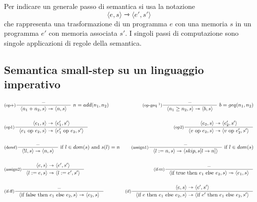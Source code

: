 \documentclass[a4paper, 11pt]{article}
\begin{document}
Per indicare un generale passo di semantica si usa la notazione \[ \langle e, s \rangle \rightarrowtriangle \langle e', s' \rangle \]
che rappresenta una trasformazione di un programma $e$ con una memoria $s$ in un programma $e'$ con memoria associata $s'$.
I singoli passi di computazione sono singole applicazioni di regole della semantica.

\subsection{Semantica small-step su un linguaggio imperativo} \label{rules}
\begin{adjustwidth}{-1.3cm}{}
\begin{align*}
	&\inference[(op+)]{-}{\langle n_1 + n_2, s \rangle \rightarrowtriangle \langle n, s \rangle}\ n = add(n_1, n_2)
	&\inference[(op-geq \footnotemark)]{-}{\langle n_1 \geq n_2, s \rangle \rightarrowtriangle \langle b, s \rangle}\ b = geq(n_1, n_2) \\
		& &\\
	&\inference[(op1)]{\langle e_1, s \rangle \rightarrowtriangle \langle e_1', s' \rangle}{\langle e_1 \text{ op } e_2, s \rangle \rightarrowtriangle \langle e_1' \text{ op } e_2, s' \rangle}  &\inference[(op2)]{\langle e_2, s \rangle \rightarrowtriangle \langle e_2', s' \rangle}{ \langle v \text{ op } e_2, s \rangle \rightarrowtriangle \langle v \text{ op } e_2', s' \rangle} \\
		& &\\
	&\inference[(deref)]{-}{\langle !l, s \rangle \rightarrowtriangle \langle n,s \rangle}\text{ if } l \in dom(s) \text{ and } s(l)=n &\inference[(assign1)]{-}{\langle l:=n,s \rangle \rightarrowtriangle \langle skip, s\lbrack l \to n\rbrack \rangle}\ \text{if } l \in dom(s) \\
		& &\\ 
	&\inference[(assign2)]{\langle e, s \rangle \rightarrowtriangle \langle e', s' \rangle}{\langle l:=e,s \rangle \rightarrowtriangle \langle l := e', s' \rangle} &\inference[(if-tt)]{-}{\langle \text{if true then } e_1 \text{ else } e_2, s \rangle \rightarrowtriangle \langle e_1, s \rangle} \\
	& & \\
	&\inference[(if-ff)]{-}{\langle \text{if false then } e_1 \text{ else } e_2, s \rangle \rightarrowtriangle \langle e_2, s \rangle} &\inference[(if)]{\langle e, s \rangle \rightarrowtriangle \langle e', s' \rangle}{\langle \text{if } e \text{ then } e_1 \text{ else } e_2, s \rangle \rightarrowtriangle \langle \text{if } e' \text{ then } e_1 \text{ else } e_2, s' \rangle} \\

\end{align*}
\end{adjustwidth}
\end{document}
